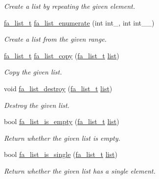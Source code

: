 \begin{DoxyCompactItemize}
\begin{DoxyCompactList}\small\item\em Create a list by repeating the given element. \end{DoxyCompactList}\item 
\hyperlink{group___fa_list_ga35ecb12ab934ded0cce0bcf28e3bc5d2}{fa\-\_\-list\-\_\-t} \hyperlink{group___fa_list_ga032f7d2288130530305801146e76093c}{fa\-\_\-list\-\_\-enumerate} (int int\-\_\-, int int\-\_\-\-\_\-)
\begin{DoxyCompactList}\small\item\em Create a list from the given range. \end{DoxyCompactList}\item 
\hyperlink{group___fa_list_ga35ecb12ab934ded0cce0bcf28e3bc5d2}{fa\-\_\-list\-\_\-t} \hyperlink{group___fa_list_ga21ddfd967b94ffb34215a74de16fe106}{fa\-\_\-list\-\_\-copy} (\hyperlink{group___fa_list_ga35ecb12ab934ded0cce0bcf28e3bc5d2}{fa\-\_\-list\-\_\-t} \hyperlink{literals_8h_a4ddd63dfcfec2b4d5741a56aa6003c76}{list})
\begin{DoxyCompactList}\small\item\em Copy the given list. \end{DoxyCompactList}\item 
void \hyperlink{group___fa_list_gafbf19f83b9ea6896be97f5bf572d61ad}{fa\-\_\-list\-\_\-destroy} (\hyperlink{group___fa_list_ga35ecb12ab934ded0cce0bcf28e3bc5d2}{fa\-\_\-list\-\_\-t} \hyperlink{literals_8h_a4ddd63dfcfec2b4d5741a56aa6003c76}{list})
\begin{DoxyCompactList}\small\item\em Destroy the given list. \end{DoxyCompactList}\item 
bool \hyperlink{group___fa_list_ga094f7dda2ad993812f47804f4d68dfaa}{fa\-\_\-list\-\_\-is\-\_\-empty} (\hyperlink{group___fa_list_ga35ecb12ab934ded0cce0bcf28e3bc5d2}{fa\-\_\-list\-\_\-t} \hyperlink{literals_8h_a4ddd63dfcfec2b4d5741a56aa6003c76}{list})
\begin{DoxyCompactList}\small\item\em Return whether the given list is empty. \end{DoxyCompactList}\item 
bool \hyperlink{group___fa_list_gab7cd6228e5a29b4e07ec65c5e35780d0}{fa\-\_\-list\-\_\-is\-\_\-single} (\hyperlink{group___fa_list_ga35ecb12ab934ded0cce0bcf28e3bc5d2}{fa\-\_\-list\-\_\-t} \hyperlink{literals_8h_a4ddd63dfcfec2b4d5741a56aa6003c76}{list})
\begin{DoxyCompactList}\small\item\em Return whether the given list has a single element. \end{DoxyCompactList}\item 

\end{DoxyCompactItemize}
